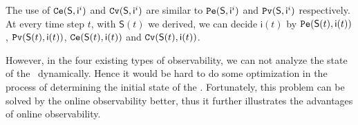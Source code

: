 The use of ${\tt Ce}(\mathsf{S}, \mathsf{ i}^{i})$ and ${\tt Cv}(\mathsf{S}, \mathsf{ i}^{i})$ are similar to ${\tt Pe}(\mathsf{S}, \mathsf{ i}^{i})$ and ${\tt Pv}(\mathsf{S}, \mathsf{ i}^{i})$ respectively. At every time step $t$, with $\mathsf{S}(t)$ we derived, we can decide $\mathsf{i}(t)$ by $ {\tt Pe}(\mathsf{S}(t), \mathsf{ i}(t))$, ${\tt Pv}(\mathsf{S}(t), \mathsf{ i}(t))$, ${\tt Ce}(\mathsf{S}(t), \mathsf{ i}(t))$ and ${\tt Cv}(\mathsf{S}(t), \mathsf{ i}(t))$.

However, in the four existing types of observability, we can not analyze the state of the \BCNs\ dynamically. Hence it would be hard to do some optimization in the process of determining the initial state of the \BCNs. Fortunately, this problem can be solved by the online observability better, thus it further illustrates the advantages of online observability.